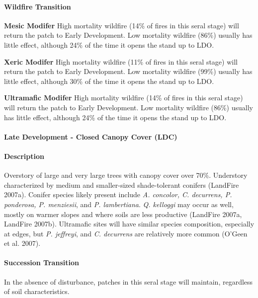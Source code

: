 \paragraph{Wildfire Transition}
\begin{adjustwidth}{2cm}{}
\textbf{Mesic Modifer } High mortality wildfire (14\% of fires in this seral stage) will return the patch to Early Development. Low mortality wildfire (86\%) usually has little effect, although 24\% of the time it opens the stand up to LDO. 

\textbf{Xeric Modifer} High mortality wildfire (11\% of fires in this seral stage) will return the patch to Early Development. Low mortality wildfire (99\%) usually has little effect, although 30\% of the time it opens the stand up to LDO. 

\textbf{Ultramafic Modifer} High mortality wildfire (14\% of fires in this seral stage) will return the patch to Early Development. Low mortality wildfire (86\%) usually has little effect, although 24\% of the time it opens the stand up to LDO. 

\end{adjustwidth}

\noindent\hrulefill

\paragraph{Late Development - Closed Canopy Cover (LDC)}

\paragraph{Description} Overstory of large and very large trees with canopy cover over 70\%. Understory characterized by medium and smaller-sized shade-tolerant conifers (LandFire 2007a). Conifer species likely present include \emph{A. concolor, C. decurrens, P. ponderosa, P. menziesii}, and \emph{P. lambertiana}. \emph{Q. kelloggi} may occur as well, mostly on warmer slopes and where soils are less productive (LandFire 2007a, LandFire 2007b). Ultramafic sites will have similar species composition, especially at edges, but \emph{P. jeffreyi}, and \emph{C. decurrens} are relatively more common (O’Geen et al. 2007).

\paragraph{Succession Transition} In the absence of disturbance, patches in this seral stage will maintain, regardless of soil characteristics.

